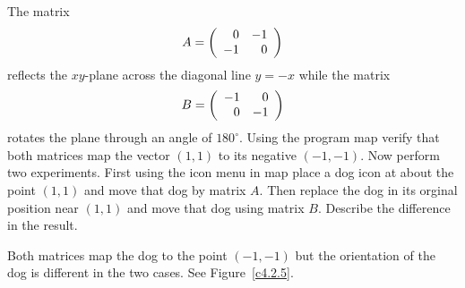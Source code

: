 \documentclass{ximera}
\begin{document}
\begin{exercise}  \label{c4.2.5}
The matrix 
\[
A = \left(\begin{array}{rr} 0 & -1\\ -1 &0\end{array}\right)
\]
reflects the $xy$-plane across the diagonal line $y=-x$ while the matrix
\[
B=\left(\begin{array}{rr} -1 & 0\\ 0 &-1\end{array}\right)
\]
rotates the plane through an angle of $180^\circ$. Using the program 
{\sf map} verify that both matrices map the vector $(1,1)$ to its negative
$(-1,-1)$.  Now perform two experiments.  First using the {\sf icon} menu in 
{\sf map} place a dog icon at about the point $(1,1)$ and move that dog by 
matrix $A$.  Then replace the dog in its orginal position near $(1,1)$ and 
move that dog using matrix $B$.  Describe the difference in the result.

\begin{solution}
Both matrices map the dog to the point $(-1,-1)$ but the
orientation of the dog is different in the two cases.  See 
Figure~\ref{c4.2.5}.
\begin{figure}[htb]
     \centerline{%
     }
\end{figure} 



\end{solution}
\end{exercise}   
\end{document}
